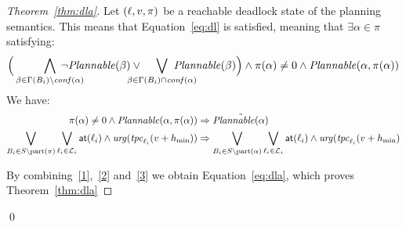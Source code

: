 \begin{proof}[Theorem~\ref{thm:dla}]
  Let $(\ell,v,\pi)$ be a reachable deadlock state of the planning semantics. This 
  means that Equation~\ref{eq:dl} is satisfied, meaning that $\exists\alpha\in\pi$ 
  satisfying:
  \begin{equation}\label{1}
    \Big(\bigwedge_{\beta\in\Gamma(B_i)\setminus\confl(\alpha)}\hspace{-8mm}
    \neg\plntxt{\beta}\vee\hspace{-5mm}\bigvee_{\beta\in\Gamma(B_i)\cap\confl(\alpha)}
    \hspace{-8mm}\plntxt{\beta}\Big)\wedge\pi(\alpha)\neq0\wedge
    \plnIntxt{\alpha}{\pi(\alpha)}
  \end{equation}
  We have:
  \begin{align}
  \pi(\alpha)\neq0\wedge\mathit{Plannable(\alpha,\pi(\alpha))}
  &\Rightarrow\tilde{\mathit{Plannable(\alpha)}}\label{2}\\
  \bigvee_{B_i\in S\setminus\mathrm{part}(\pi)}\bigvee_{\ell_i\in\mathcal{L}_i}\textnormal{\textsf{at}}(\ell_i)\wedge\textnormal{\textit{urg}}(\mathit{tpc}_{\ell_i}(v+h_{\min}))&\Rightarrow\bigvee_{B_i\in S\setminus\mathrm{part}(\alpha)}\bigvee_{\ell_i\in\mathcal{L}_i}\textnormal{\textsf{at}}(\ell_i)\wedge\textnormal{\textit{urg}}(\mathit{tpc}_{\ell_i}(v+h_{\min})\label{3}
   \end{align}
     
   By combining~\ref{1},~\ref{2} and~\ref{3} we obtain Equation~\ref{eq:dla}, which
   proves Theorem~\ref{thm:dla}


\end{proof}
\qed
